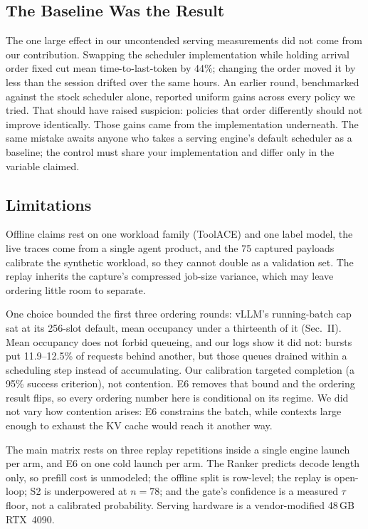 \subsection{The Baseline Was the Result}
The one large effect in our uncontended serving measurements did not come
from our contribution. Swapping the scheduler implementation while holding
arrival order fixed cut mean time-to-last-token by 44\%; changing the order
moved it by less than the session drifted over the same hours. An earlier
round, benchmarked against the stock scheduler alone, reported uniform gains
across every policy we tried. That should have raised suspicion: policies
that order differently should not improve identically.
Those gains came from the implementation underneath. The same mistake awaits
anyone who takes a serving engine's default scheduler as a baseline; the
control must share your implementation and differ only in the variable
claimed.

\subsection{Limitations}
Offline claims rest on one workload family (ToolACE) and one label model,
the live traces come from a single agent product, and the 75 captured
payloads calibrate the synthetic workload, so they cannot double as a
validation set. The replay inherits the capture's compressed job-size
variance, which may leave ordering little room to separate.

One choice bounded the first three ordering rounds: vLLM's running-batch cap
sat at its 256-slot default, mean occupancy under a thirteenth of it
(Sec.~II). Mean occupancy does not forbid queueing, and our logs show it
did not: bursts put
11.9--12.5\% of requests behind another, but those queues drained within a
scheduling step instead of accumulating. Our calibration targeted completion
(a 95\% success criterion), not contention. E6 removes that bound and the
ordering result flips, so every ordering number here is conditional on its
regime. We did not vary how contention arises: E6 constrains the batch, while contexts large enough to
exhaust the KV cache would reach it another way.

The main matrix rests on three replay repetitions inside a single engine launch
per arm, and E6 on one cold launch per arm. The Ranker predicts decode
length
only, so prefill cost is unmodeled; the offline split is row-level; the
replay is open-loop; S2 is underpowered at $n{=}78$; and the gate's
confidence is a measured $\tau$ floor, not a calibrated probability. Serving
hardware is a vendor-modified 48\,GB RTX~4090.

